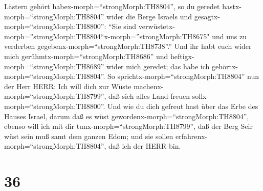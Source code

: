 Lästern gehört habex-morph=``strongMorph:TH8804'', so du geredet
hastx-morph=``strongMorph:TH8804'' wider die Berge Israels und
gesagtx-morph=``strongMorph:TH8800'': ``Sie sind
verwüstetx-morph=''strongMorph:TH8804``\textbar x-morph=''strongMorph:TH8675"
und uns zu verderben gegebenx-morph=``strongMorph:TH8738''.''
 Und ihr habt euch wider mich
gerühmtx-morph=``strongMorph:TH8686'' und
heftigx-morph=``strongMorph:TH8689'' wider mich geredet; das habe ich
gehörtx-morph=``strongMorph:TH8804''.  So
sprichtx-morph=``strongMorph:TH8804'' nun der Herr HERR: Ich will dich
zur Wüste machenx-morph=``strongMorph:TH8799'', daß sich alles Land
freuen sollx-morph=``strongMorph:TH8800''.  Und wie du dich
gefreut hast über das Erbe des Hauses Israel, darum daß es wüst
gewordenx-morph=``strongMorph:TH8804'', ebenso will ich mit dir
tunx-morph=``strongMorph:TH8799'', daß der Berg Seir wüst sein muß samt
dem ganzen Edom; und sie sollen erfahrenx-morph=``strongMorph:TH8804'',
daß ich der HERR bin.

\hypertarget{section-35}{%
\section{36}\label{section-35}}

